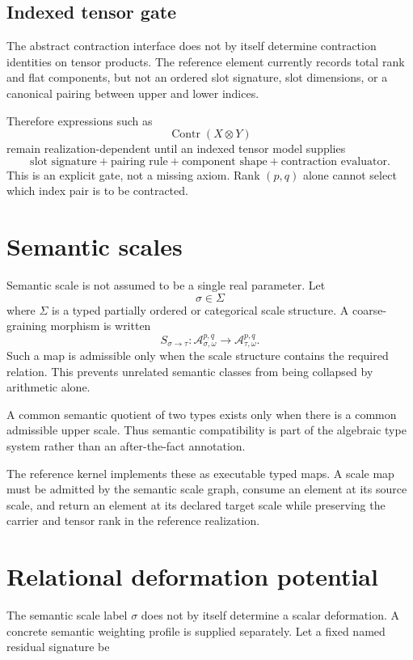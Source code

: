 \documentclass[11pt]{article}
\begin{document}
\subsection{Indexed tensor gate}

The abstract contraction interface does not by itself determine contraction
identities on tensor products. The reference element currently records total
rank and flat components, but not an ordered slot signature, slot dimensions,
or a canonical pairing between upper and lower indices.

Therefore expressions such as
\[
\operatorname{Contr}(X\otimes Y)
\]
remain realization-dependent until an indexed tensor model supplies
\[
\boxed{
\text{slot signature}
+
\text{pairing rule}
+
\text{component shape}
+
\text{contraction evaluator}.
}
\]
This is an explicit gate, not a missing axiom. Rank \((p,q)\) alone cannot
select which index pair is to be contracted.

\section{Semantic scales}

Semantic scale is not assumed to be a single real parameter. Let
\[
\boxed{\sigma\in\Sigma}
\]
where \(\Sigma\) is a typed partially ordered or categorical scale
structure. A coarse-graining morphism is written
\[
S_{\sigma\to\tau}:
\mathcal A_{\sigma,\omega}^{p,q}
\to
\mathcal A_{\tau,\omega}^{p,q}.
\]
Such a map is admissible only when the scale structure contains the required
relation. This prevents unrelated semantic classes from being collapsed by
arithmetic alone.

A common semantic quotient of two types exists only when there is a common
admissible upper scale. Thus semantic compatibility is part of the algebraic
type system rather than an after-the-fact annotation.

The reference kernel implements these as executable typed maps. A scale map
must be admitted by the semantic scale graph, consume an element at its source
scale, and return an element at its declared target scale while preserving the
carrier and tensor rank in the reference realization.

\section{Relational deformation potential}

The semantic scale label \(\sigma\) does not by itself determine a scalar
deformation. A concrete semantic weighting profile is supplied separately.
Let a fixed named residual signature be
\end{document}
